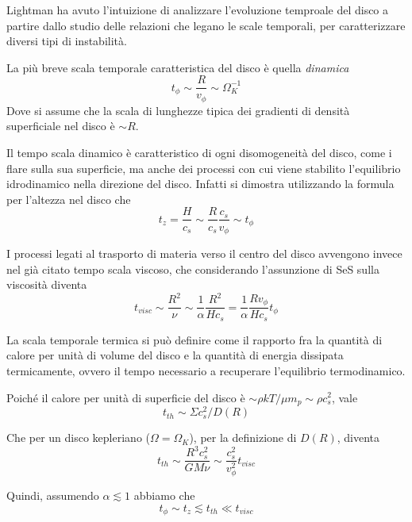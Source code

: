 \documentclass[a4paperbi]{article}
\begin{document}
	Lightman ha avuto l'intuizione di analizzare l'evoluzione temproale del disco a partire dallo studio delle relazioni che legano le scale temporali, per caratterizzare diversi tipi di instabilità.	
	
	La più breve scala temporale caratteristica del disco è quella \textit{dinamica}
	\begin{equation}
		t_\phi\sim\frac{R}{v_\phi}\sim\Omega_K^{-1}
	\end{equation}
	Dove si assume che la scala di lunghezze tipica dei gradienti di densità superficiale nel disco è $\sim R$.
	
	Il tempo scala dinamico è caratteristico di ogni disomogeneità del disco, come i flare sulla sua superficie, ma anche dei processi con cui viene stabilito l'equilibrio idrodinamico nella direzione del disco. Infatti si dimostra utilizzando la formula per l'altezza nel disco che
	\begin{equation}
		t_z=\frac{H}{c_s}\sim \frac{R}{c_s}\frac{c_s}{v_\phi}\sim t_\phi
	\end{equation}
	
	I processi legati al trasporto di materia verso il centro del disco avvengono invece nel già citato tempo scala viscoso, che considerando l'assunzione di SeS sulla viscosità diventa
	\begin{equation}
		t_{visc}\sim\frac{R^2}{\nu}\sim\frac{1}{\alpha}\frac{R^2}{Hc_s}=\frac{1}{\alpha}\frac{Rv_\phi}{Hc_s}t_\phi
	\end{equation}

	La scala temporale termica si può definire come il rapporto fra la quantità di calore per unità di volume del disco e la quantità di energia dissipata termicamente, ovvero il tempo necessario a recuperare l'equilibrio termodinamico.
	
	Poiché il calore per unità di superficie del disco è $\sim\rho kT/\mu m_p\sim\rho c_s^2$, vale
	\begin{equation*}
		t_{th}\sim\Sigma c_s^2/D(R)
	\end{equation*}
	
	Che per un disco kepleriano ($\Omega=\Omega_K$), per la definizione di $D(R)$, diventa
	\begin{equation}
		t_{th}\sim\frac{R^3c_s^2}{GM\nu}\sim\frac{c_s^2}{v_\phi^2}t_{visc}
	\end{equation}
	
	Quindi, assumendo $\alpha\lesssim1$ abbiamo che
	\begin{equation}
		t_\phi\sim t_z\lesssim t_{th}\ll t_{visc}	
	\end{equation}
\end{document}
